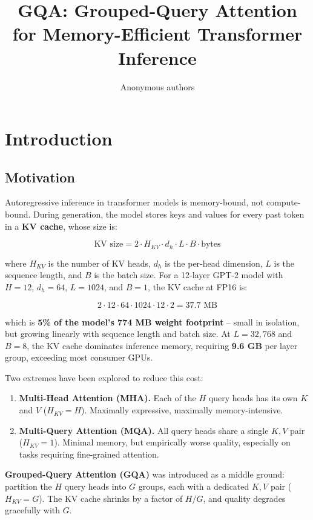 \title{\textbf{GQA: Grouped-Query Attention for Memory-Efficient Transformer Inference}}

\author{Anonymous authors}



\section{Introduction}

\subsection{Motivation}

Autoregressive inference in transformer models is memory-bound, not 
compute-bound. During generation, the model stores keys and values for every 
past token in a \textbf{KV cache}, whose size is:

\[
\text{KV size} = 2 \cdot H_{KV} \cdot d_h \cdot L \cdot B \cdot \text{bytes}
\tag{1.1}
\]

where $H_{KV}$ is the number of KV heads, $d_h$ is the per-head dimension, 
$L$ is the sequence length, and $B$ is the batch size. For a 12-layer GPT-2 
model with $H = 12$, $d_h = 64$, $L = 1024$, and $B = 1$, the KV cache at 
FP16 is:

\[
2 \cdot 12 \cdot 64 \cdot 1024 \cdot 12 \cdot 2 = 37.7 \text{ MB}
\tag{1.2}
\]

which is \textbf{5\% of the model's 774 MB weight footprint} -- small in isolation, 
but growing linearly with sequence length and batch size. At $L = 32{,}768$ 
and $B = 8$, the KV cache dominates inference memory, requiring \textbf{9.6 GB} 
per layer group, exceeding most consumer GPUs.

Two extremes have been explored to reduce this cost:

\begin{enumerate}
\item \textbf{Multi-Head Attention (MHA).} Each of the $H$ query heads has its own
  $K$ and $V$ ($H_{KV} = H$). Maximally expressive, maximally memory-intensive.
\item \textbf{Multi-Query Attention (MQA).} All query heads share a single $K, V$
  pair ($H_{KV} = 1$). Minimal memory, but empirically worse quality,
  especially on tasks requiring fine-grained attention.

\end{enumerate}
\textbf{Grouped-Query Attention (GQA)} was introduced as a middle ground: partition 
the $H$ query heads into $G$ groups, each with a dedicated $K, V$ pair 
($H_{KV} = G$). The KV cache shrinks by a factor of $H / G$, and quality 
degrades gracefully with $G$.

